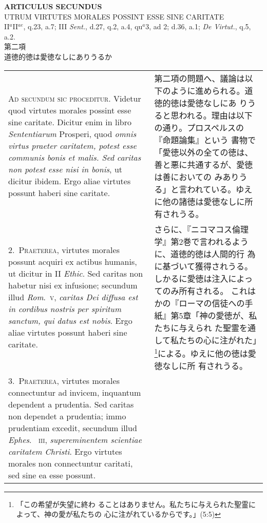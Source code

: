 \documentclass[10pt]{jsarticle}
\begin{document}
\begin{center}
{\Large {\bf ARTICULUS SECUNDUS}}\\
{\large UTRUM VIRTUTES MORALES POSSINT ESSE SINE CARITATE}\\
{\footnotesize II$^{a}$II$^{ae}$, q.23, a.7; III {\itshape Sent.}, d.27, q.2, a.4, qu$^{a}$3, ad 2; d.36, a.1; {\itshape De Virtut.}, q.5, a.2.}\\
{\Large 第二項\\道徳的徳は愛徳なしにありうるか}
\end{center}

\begin{longtable}{p{21em}p{21em}}
 {\scshape Ad secundum sic proceditur}. Videtur quod virtutes morales
 possint esse sine caritate. Dicitur enim in libro {\itshape
 Sententiarum} Prosperi, quod {\itshape omnis virtus praeter
 caritatem, potest esse communis bonis et malis. Sed caritas non
 potest esse nisi in bonis}, ut dicitur ibidem. Ergo aliae virtutes
 possunt haberi sine caritate.

 
&

 第二項の問題へ、議論は以下のように進められる。道徳的徳は愛徳なしにあ
 りうると思われる。理由は以下の通り。プロスペルスの『命題論集』という
 書物で「愛徳以外の全ての徳は、善と悪に共通するが、愛徳は善においての
 みありうる」と言われている。ゆえに他の諸徳は愛徳なしに所有されうる。

\\

2.~{\scshape Praeterea}, virtutes morales possunt acquiri ex actibus
humanis, ut dicitur in II {\itshape Ethic}. Sed caritas non habetur
nisi ex infusione; secundum illud {\itshape Rom}.~{\scshape v},
{\itshape caritas Dei diffusa est in cordibus nostris per spiritum
sanctum, qui datus est nobis}. Ergo aliae virtutes possunt haberi sine
caritate.
 
&

 さらに、『ニコマコス倫理学』第2巻で言われるように、道徳的徳は人間的行
 為に基づいて獲得されうる。しかるに愛徳は注入によってのみ所有される。
 これはかの『ローマの信徒への手紙』第5章「神の愛徳が、私たちに与えられ
 た聖霊を通して私たちの心に注がれた」\footnote{「この希望が失望に終わ
 ることはありません。私たちに与えられた聖霊によって、神の愛が私たちの
 心に注がれているからです。」(5:5)}による。ゆえに他の徳は愛徳なしに所
 有されうる。

\\

3.~{\scshape Praeterea}, virtutes morales connectuntur ad invicem,
inquantum dependent a prudentia. Sed caritas non dependet a prudentia;
immo prudentiam excedit, secundum illud {\itshape Ephes}.~{\scshape
iii}, {\itshape supereminentem scientiae caritatem Christi}. Ergo
virtutes morales non connectuntur caritati, sed sine ea esse possunt.


\end{longtable}
\end{document}
